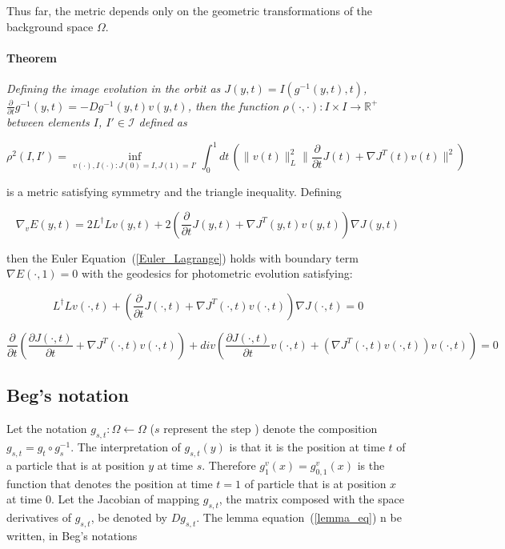 \documentclass[final, paper=letter,5p,times,twocolumn]{elsarticle}
\theoremstyle{definition}
\begin{document}
Thus far, the metric depends only on the geometric transformations of the background space $\Omega$.

\paragraph{Theorem}{\it Defining the image evolution in the orbit as $J(y, t) = I(g^{−1}(y, t), t)$, $\frac{\partial}{\partial t} g^{-1}(y, t) = −Dg^{−1}(y, t)v(y, t)$, then the function $\rho(\cdot, \cdot): I \times I \rightarrow \mathbb{R}^{+}$ between elements $I$, $I' \in \mathcal{I}$ defined as 

$$
\rho^{2}(I,I') = \underset{v(\cdot),I(\cdot):J(0) = I, J(1) = I'}{\inf} \int_{0}^{1} dt \, \left( \| v(t) \|_{L}^{2} \| \frac{\partial }{\partial t} J(t) + \nabla J^{T} (t)v(t)\|^{2} \right)
$$

is a metric satisfying symmetry and the triangle inequality. Defining

$$
\nabla_{v}E(y,t) = 2L^{\dag}Lv(y,t) + 2 \left( \frac{\partial}{\partial t} J(y,t) + \nabla J^{T}(y,t) v(y,t) \right) \nabla J(y,t)
$$

then the Euler Equation~(\ref{Euler_Lagrange}) holds with boundary term $\nabla E (\cdot, 1) = 0$ with the geodesics for photometric evolution satisfying:

$$
L^{\dag}Lv(\cdot,t) + \left( \frac{\partial}{\partial t} J(\cdot,t) + \nabla J^{T}(\cdot,t) v(\cdot,t) \right) \nabla J(\cdot,t) = 0
$$

$$
\frac{\partial}{\partial t}\left( \frac{\partial J(\cdot,t)}{\partial t} + \nabla J^{T}(\cdot,t) v(\cdot,t) \right) + div\left( \frac{\partial J(\cdot,t)}{\partial t} v(\cdot, t) + (\nabla J^{T}(\cdot,t) v(\cdot,t)) v(\cdot, t) \right) = 0
$$
}

\subsection{Beg's notation}

Let the notation $g_{s,t}: \Omega \leftarrow \Omega$ ($s$ represent the step ) denote the composition $g_{s,t} = g_{t} \circ g_{s}^{-1}$. The interpretation of $g_{s,t}(y)$ is that it is the position at time $t$ of a particle that is at position $y$ at time $s$. Therefore $g_{1}^{v}(x) = g_{0,1}^{v}(x)$  is the function that denotes the position at time $t = 1$ of particle that is at position $x$ at time 0. Let the Jacobian of mapping $g_{s,t}$, the matrix composed with the space derivatives of $g_{s,t}$, be denoted by $Dg_{s,t}$. The lemma equation~(\ref{lemma_eq}) n be written, in Beg's notations
\end{document}
